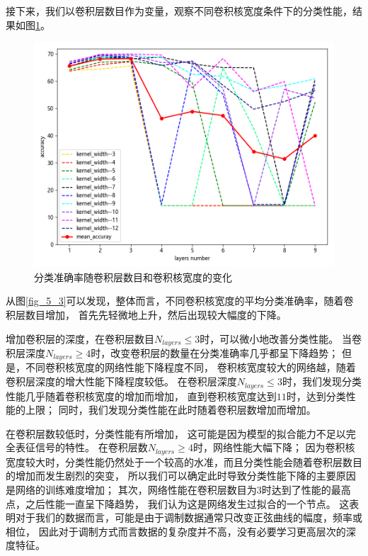 接下来，我们以卷积层数目作为变量，观察不同卷积核宽度条件下的分类性能，结果如图\ref{fig_5_2}。
\begin{figure}[!h]
	\centering
	\includegraphics[scale=0.6]{figures/chapter_5/fig_5_4}
	\caption{分类准确率随卷积层数目和卷积核宽度的变化}
	\label{fig_5_2}
\end{figure}

从图\ref{fig_5_3}可以发现，整体而言，不同卷积核宽度的平均分类准确率，随着卷积层数目增加，
首先先轻微地上升，然后出现较大幅度的下降。\par

增加卷积层的深度，在卷积层数目$N_{layers} \leq 3$时，可以微小地改善分类性能。
当卷积层深度$N_{layers} \geq 4$时，改变卷积层的数量在分类准确率几乎都呈下降趋势；
但是，不同卷积核宽度的网络性能下降程度不同，
卷积核宽度较大的网络越，随着卷积层深度的增大性能下降程度较低。
在卷积层深度$N_{layers} \leq 3$时，我们发现分类性能几乎随着卷积核宽度的增加而增加，
直到卷积核宽度达到$11$时，达到分类性能的上限；
同时，我们发现分类性能在此时随着卷积层数增加而增加。\par

在卷积层数较低时，分类性能有所增加，
这可能是因为模型的拟合能力不足以完全表征信号的特性。
在卷积层数$N_{layers} \geq 4$时，网络性能大幅下降；
因为卷积核宽度较大时，分类性能仍然处于一个较高的水准，而且分类性能会随着卷积层数目的增加而发生剧烈的突变，
所以我们可以确定此时导致分类性能下降的主要原因是网络的训练难度增加；
其次，网络性能在卷积层数目为$3$时达到了性能的最高点，之后性能一直呈下降趋势，
我们认为这是网络发生过拟合的一个节点。
这表明对于我们的数据而言，可能是由于调制数据通常只改变正弦曲线的幅度，频率或相位，
因此对于调制方式而言数据的复杂度并不高，没有必要学习更高层次的深度特征。
\par

